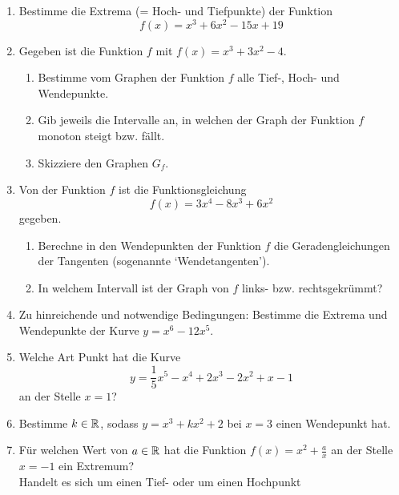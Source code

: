 \begin{enumerate}
    \item Bestimme die Extrema (= Hoch- und Tiefpunkte) der Funktion  $$ f(x) = x^3 + 6x^2 - 15x + 19$$
    \item  Gegeben ist die Funktion \( f \) mit \( f(x) = x^3 + 3x^2 - 4 \).
          \begin{enumerate}
              \item Bestimme vom Graphen der Funktion \( f \) alle Tief-, Hoch- und Wendepunkte.
              \item Gib jeweils die Intervalle an, in welchen der Graph der Funktion \( f \) monoton steigt bzw. fällt.
              \item Skizziere den Graphen \( G_f \).
          \end{enumerate}
    \item Von der Funktion \( f \) ist die Funktionsgleichung
          \[
              f(x) = 3x^4 - 8x^3 + 6x^2
          \]
          gegeben.
          \begin{enumerate}
              \item Berechne in den Wendepunkten der Funktion \( f \) die Geradengleichungen der Tangenten (sogenannte `Wendetangenten').
              \item In welchem Intervall ist der Graph von \( f \) links- bzw. rechtsgekrümmt?
          \end{enumerate}
    \item Zu hinreichende und notwendige Bedingungen: Bestimme die Extrema und Wendepunkte der Kurve $y=x^6-12x^5$.

    \item Welche Art Punkt hat die Kurve
          $$ y= \frac{1}{5} x^5 - x^4 + 2x^3 -2 x^2 + x - 1$$
          an der Stelle $x=1$?
    \item Bestimme $k\in \mathbb{R}$, sodass $y=x^3+kx^2+2$ bei $x= 3$ einen Wendepunkt hat.
    \item Für welchen Wert von $a\in\mathbb{R}$ hat die Funktion $f(x) = x^2 + \frac{a}{x}$ an der Stelle $x=-1$ ein Extremum? \\
          Handelt es sich um einen Tief- oder um einen Hochpunkt
\end{enumerate}
\newpage
